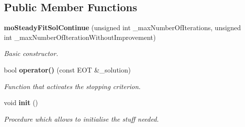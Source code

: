 \subsection*{Public Member Functions}
\begin{CompactItemize}
\item 
{\bf mo\-Steady\-Fit\-Sol\-Continue} (unsigned int \_\-max\-Number\-Of\-Iterations, unsigned int \_\-max\-Number\-Of\-Iteration\-Without\-Improvement)
\begin{CompactList}\small\item\em Basic constructor. \item\end{CompactList}\item 
bool {\bf operator()} (const EOT \&\_\-solution)
\begin{CompactList}\small\item\em Function that activates the stopping criterion. \item\end{CompactList}\item 
void {\bf init} ()
\begin{CompactList}\small\item\em Procedure which allows to initialise the stuff needed. \item\end{CompactList}\end{CompactItemize}
